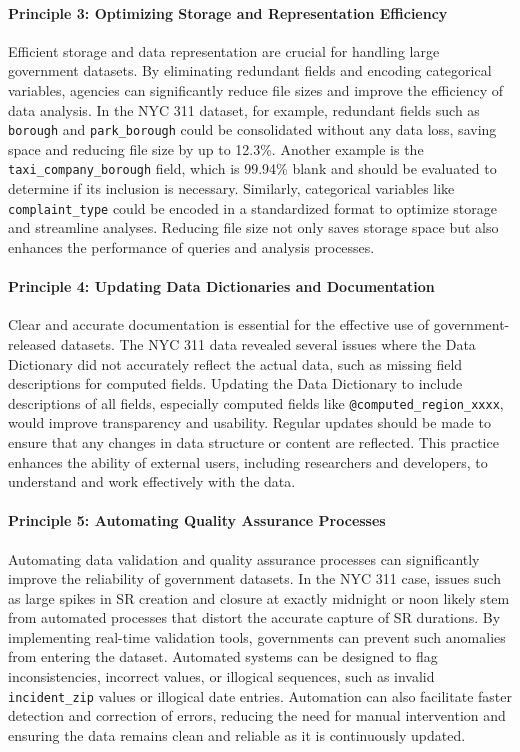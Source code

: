 \documentclass[linenumber]{jdsart}
\begin{document}
\paragraph{Principle 3: Optimizing Storage and Representation Efficiency}
Efficient storage and data representation are crucial for handling 
large government datasets. By eliminating redundant fields and 
encoding categorical variables, agencies can significantly reduce 
file sizes and improve the efficiency of data analysis. In the NYC 
311 dataset, for example, redundant fields such as \texttt{borough} 
and \texttt{park\_borough} could be consolidated without any data 
loss, saving space and reducing file size by up to 12.3\%. Another 
example is the \texttt{taxi\_company\_borough} field, which is 99.94\% 
blank and should be evaluated to determine if its inclusion is 
necessary. Similarly, categorical variables like \texttt{complaint\_type} 
could be encoded in a standardized format to optimize storage and 
streamline analyses. Reducing file size not only saves storage space 
but also enhances the performance of queries and analysis processes.

\paragraph{Principle 4: Updating Data Dictionaries and Documentation}
Clear and accurate documentation is essential for the effective use 
of government-released datasets. The NYC 311 data revealed several 
issues where the Data Dictionary did not accurately reflect the 
actual data, such as missing field descriptions for computed fields. 
Updating the Data Dictionary to include descriptions of all fields, 
especially computed fields like \texttt{@computed\_region\_xxxx}, 
would improve transparency and usability. Regular updates should 
be made to ensure that any changes in data structure or content are 
reflected. This practice enhances the ability of external users, 
including researchers and developers, to understand and work 
effectively with the data.

\paragraph{Principle 5: Automating Quality Assurance Processes}
Automating data validation and quality assurance processes can 
significantly improve the reliability of government datasets. In the 
NYC 311 case, issues such as large spikes in SR creation and closure 
at exactly midnight or noon likely stem from automated processes that 
distort the accurate capture of SR durations. By implementing 
real-time validation tools, governments can prevent such anomalies 
from entering the dataset. Automated systems can be designed to 
flag inconsistencies, incorrect values, or illogical sequences, such 
as invalid \texttt{incident\_zip} values or illogical date entries. 
Automation can also facilitate faster detection and correction of 
errors, reducing the need for manual intervention and ensuring 
the data remains clean and reliable as it is continuously updated.
\end{document}
